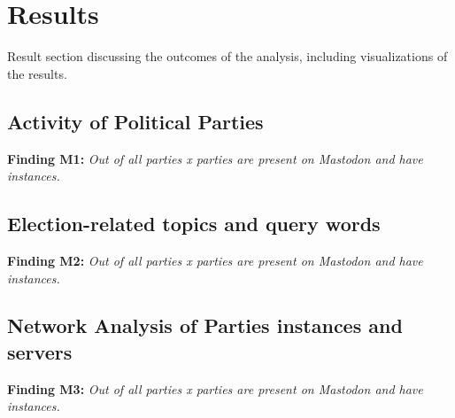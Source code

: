 \section{Results}

Result section discussing the outcomes of the analysis, including visualizations of the results.

\subsection{Activity of Political Parties}

\textbf{Finding M1:} \textit{Out of all parties x parties are present on Mastodon and have instances.}

\subsection{Election-related topics and query words}

\textbf{Finding M2:} \textit{Out of all parties x parties are present on Mastodon and have instances.}

\subsection{Network Analysis of Parties instances and servers}

\textbf{Finding M3:} \textit{Out of all parties x parties are present on Mastodon and have instances.}